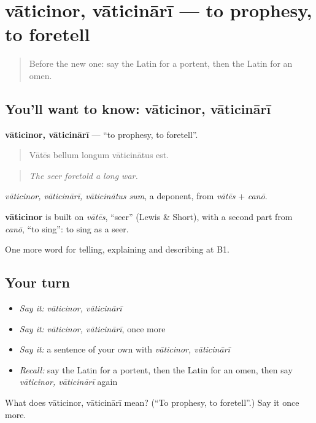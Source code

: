 \section[vāticinor, vāticinārī]{vāticinor, vāticinārī — to prophesy, to foretell}

\label{lesson:LA-C348-vaticinor}



\begin{quote}
Before the new one: say the Latin for a portent, then the Latin for an omen.
\end{quote}

\subsection*{You'll want to know: vāticinor, vāticinārī}
\textbf{vāticinor, vāticinārī} — \textquotedblleft{}to prophesy, to foretell\textquotedblright{}.

\begin{quote}
Vātēs bellum longum vāticinātus est.
\end{quote}

\begin{quote}
\emph{The seer foretold a long war.}
\end{quote}

\emph{vāticinor, vāticinārī, vāticinātus sum}, a deponent, from \emph{vātēs} + \emph{canō}.

\begin{cousinweb}
\textbf{vāticinor} is built on \emph{vātēs}, \textquotedblleft{}seer\textquotedblright{} (Lewis \& Short), with a second part from \emph{canō}, \textquotedblleft{}to sing\textquotedblright{}: to sing as a seer.
\end{cousinweb}

\begin{grammarlens}[title={What you've built}]
One more word for telling, explaining and describing at B1.
\end{grammarlens}

\subsection*{Your turn}
\begin{itemize}
\raggedright
  \item \emph{Say it:} \emph{vāticinor, vāticinārī}
  \item \emph{Say it:} \emph{vāticinor, vāticinārī}, once more
  \item \emph{Say it:} a sentence of your own with \emph{vāticinor, vāticinārī}
  \item \emph{Recall:} say the Latin for a portent, then the Latin for an omen, then say \emph{vāticinor, vāticinārī} again
\end{itemize}

\begin{tcolorbox}[breakable,colback=teal!4,colframe=teal!35!black,title={Before you move on}]
What does vāticinor, vāticinārī mean? (\textquotedblleft{}To prophesy, to foretell\textquotedblright{}.) Say it once more.
\end{tcolorbox}

